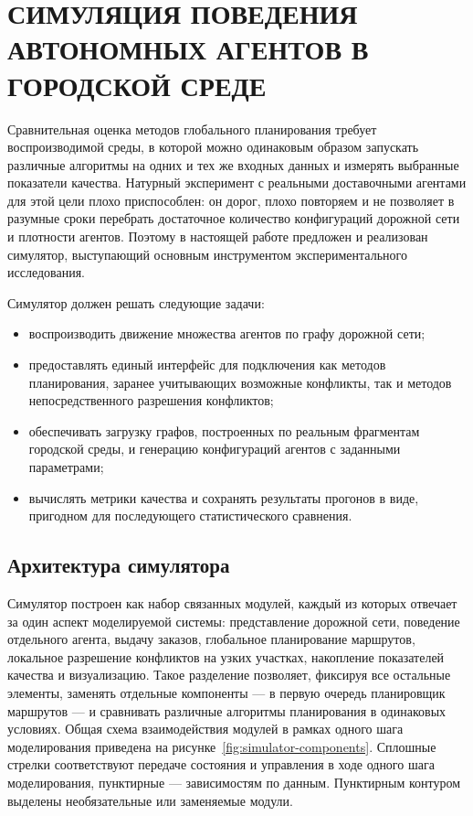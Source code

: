 \section{СИМУЛЯЦИЯ ПОВЕДЕНИЯ АВТОНОМНЫХ АГЕНТОВ В ГОРОДСКОЙ СРЕДЕ}

Сравнительная оценка методов глобального планирования требует воспроизводимой среды, в которой можно 
одинаковым образом запускать различные алгоритмы на одних и тех же входных данных и измерять выбранные 
показатели качества. Натурный эксперимент с реальными доставочными агентами для этой цели плохо 
приспособлен: он дорог, плохо повторяем и не позволяет в разумные сроки перебрать достаточное количество
конфигураций дорожной сети и плотности агентов. Поэтому в настоящей работе предложен и реализован 
симулятор, выступающий основным инструментом экспериментального исследования.

Симулятор должен решать следующие задачи:

\begin{itemize}
\item воспроизводить движение множества агентов по графу
      дорожной сети;
\item предоставлять единый интерфейс для подключения как методов
      планирования, заранее учитывающих возможные конфликты, так и
      методов непосредственного разрешения конфликтов;
\item обеспечивать загрузку графов, построенных по реальным фрагментам
      городской среды, и генерацию конфигураций агентов с заданными
      параметрами;
\item вычислять метрики качества и сохранять
      результаты прогонов в виде, пригодном для последующего
      статистического сравнения.
\end{itemize}

\subsection{Архитектура симулятора}

Симулятор построен как набор связанных модулей, каждый из которых отвечает за один аспект 
моделируемой системы: представление дорожной сети, поведение отдельного агента, выдачу заказов, 
глобальное планирование маршрутов, локальное разрешение конфликтов на узких участках, накопление
показателей качества и визуализацию. Такое разделение позволяет, фиксируя все остальные элементы, 
заменять отдельные компоненты --- в первую очередь планировщик маршрутов --- и сравнивать различные 
алгоритмы планирования в одинаковых условиях. Общая схема взаимодействия модулей в рамках одного 
шага моделирования приведена на рисунке~\ref{fig:simulator-components}. Сплошные стрелки соответствуют 
передаче состояния и управления в ходе одного шага моделирования, пунктирные --- зависимостям по 
данным. Пунктирным контуром выделены необязательные или заменяемые модули.

